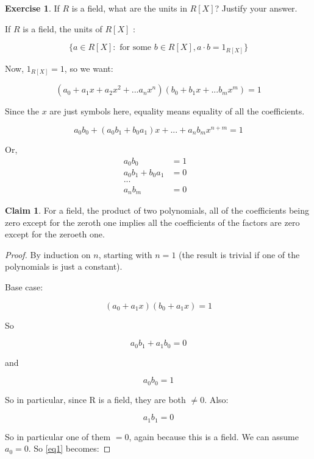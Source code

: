 \documentclass[11pt,oneside]{article}
\numberwithin{equation}{section}
\theoremstyle{definition}
\newtheorem{exercise}{Exercise}
\newtheorem*{claim}{Claim}
\begin{document}
\begin{exercise}
  If $R$ is a field, what are the units in $R[X]$?  Justify your answer.  
\end{exercise}
\begin{solution}
  If $R$ is a field, the units of $R[X]$ :

  $$
  \{ a \in R[X] : \textrm{ for some } b \in R[X], a \cdot b = 1 _ {R[X]} \}
  $$

  Now, $1_{R[X]} = 1$, so we want:

  $$
  (a_0 + a_1 x + a_2 x^2 + ... a_n x^n) ( b_0 + b_1 x + ... b_m x^m) = 1
  $$

  Since the $x$ are just symbols here, equality means equality of all the coefficients.

  $$
  a_0 b_0 + (a_0 b_1 + b_0 a_1 ) x + ... + a_n b_m x^ {n+m} = 1
  $$
  
  Or,
  \begin{align*}
    a_0 b_0 & = 1 & \\
    a_0 b_1 + b_0 a_1 & =0 \\
    ...& & \\
    a_n b_m & = 0
  \end{align*}

  \begin{claim}
    For a field, the product of two polynomials, all of the
    coefficients being zero except for the zeroth one implies all the
    coefficients of the factors are zero except for the zeroeth one.  
  \end{claim}
  \begin{proof}
    By induction on $n$, starting with $n = 1$ (the result is
    trivial if one of the polynomials is just a constant).

    Base case:

    $$
    (a_0 + a_1x) (b_0 + a_1x) =  1
    $$

    So

    \begin{equation}
      \label{eq1}
      a_0 b_1 + a_1 b_0 = 0
    \end{equation}

    and
    
    $$
    a_0 b_0 = 1
    $$
    
    So in particular, since R is a field, they are both $\neq 0$. Also: 

    $$
    a_1 b_1 = 0
    $$
    
    So in particular one of them $ = 0$, again because this is a field.
    We can assume $a_0 = 0$. So \ref{eq1} becomes:


\end{proof}
\end{solution}
\end{document}

